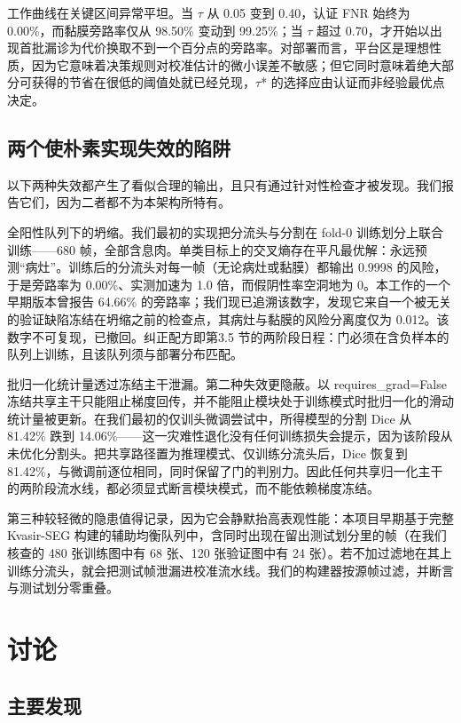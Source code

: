 \documentclass[conference]{IEEEtran}
\begin{document}
工作曲线在关键区间异常平坦。当 $\tau$ 从 0.05 变到 0.40，认证 FNR 始终为 0.00\%，而黏膜旁路率仅从 98.50\% 变动到 99.25\%；当 $\tau$ 超过 0.70，才开始以出现首批漏诊为代价换取不到一个百分点的旁路率。对部署而言，平台区是理想性质，因为它意味着决策规则对校准估计的微小误差不敏感；但它同时意味着绝大部分可获得的节省在很低的阈值处就已经兑现，$\tau$* 的选择应由认证而非经验最优点决定。

\subsection{两个使朴素实现失效的陷阱}

以下两种失效都产生了看似合理的输出，且只有通过针对性检查才被发现。我们报告它们，因为二者都不为本架构所特有。

全阳性队列下的坍缩。我们最初的实现把分流头与分割在 fold-0 训练划分上联合训练——680 帧，全部含息肉。单类目标上的交叉熵存在平凡最优解：永远预测“病灶”。训练后的分流头对每一帧（无论病灶或黏膜）都输出 0.9998 的风险，于是旁路率为 0.00\%、实测加速为 1.0 倍，而假阴性率空洞地为 0。本工作的一个早期版本曾报告 64.66\% 的旁路率；我们现已追溯该数字，发现它来自一个被无关的验证缺陷冻结在坍缩之前的检查点，其病灶与黏膜的风险分离度仅为 0.012。该数字不可复现，已撤回。纠正配方即第3.5 节的两阶段日程：门必须在含负样本的队列上训练，且该队列须与部署分布匹配。

批归一化统计量透过冻结主干泄漏。第二种失效更隐蔽。以 requires\_grad=False 冻结共享主干只能阻止梯度回传，并不能阻止模块处于训练模式时批归一化的滑动统计量被更新。在我们最初的仅训头微调尝试中，所得模型的分割 Dice 从 81.42\% 跌到 14.06\%——这一灾难性退化没有任何训练损失会提示，因为该阶段从未优化分割头。把共享路径置为推理模式、仅训练分流头后，Dice 恢复到 81.42\%，与微调前逐位相同，同时保留了门的判别力。因此任何共享归一化主干的两阶段流水线，都必须显式断言模块模式，而不能依赖梯度冻结。

第三种较轻微的隐患值得记录，因为它会静默抬高表观性能：本项目早期基于完整 Kvasir-SEG 构建的辅助均衡队列中，含同时出现在留出测试划分里的帧（在我们核查的 480 张训练图中有 68 张、120 张验证图中有 24 张）。若不加过滤地在其上训练分流头，就会把测试帧泄漏进校准流水线。我们的构建器按源帧过滤，并断言与测试划分零重叠。

\section{讨论}

\subsection{主要发现}
\end{document}
